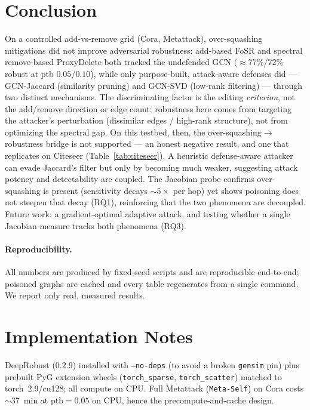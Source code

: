 \documentclass[11pt]{article}
\begin{document}
\section{Conclusion}
On a controlled add-vs-remove grid (Cora, Metattack), over-squashing mitigations did not improve
adversarial robustness: add-based FoSR and spectral remove-based ProxyDelete both tracked the undefended
GCN ($\approx$$77\%$/$72\%$ robust at ptb $0.05$/$0.10$), while only purpose-built, attack-aware defenses
did --- GCN-Jaccard (similarity pruning) and GCN-SVD (low-rank filtering) --- through two distinct
mechanisms. The discriminating factor is the editing \emph{criterion}, not the add/remove direction or
edge count: robustness here comes from targeting the attacker's perturbation (dissimilar edges / high-rank
structure), not from optimizing the spectral gap. On this testbed, then, the over-squashing$\to$robustness
bridge is not supported --- an honest negative result, and one that replicates on Citeseer
(Table~\ref{tab:citeseer}). A heuristic defense-aware attacker can evade Jaccard's filter but only by
becoming much weaker, suggesting attack potency and detectability are coupled. The Jacobian probe confirms
over-squashing is present (sensitivity decays $\sim$$5\times$ per hop) yet shows poisoning does not steepen
that decay (RQ1), reinforcing that the two phenomena are decoupled. Future work: a gradient-optimal
adaptive attack, and testing whether a single Jacobian measure tracks both phenomena (RQ3).

\paragraph{Reproducibility.} All numbers are produced by fixed-seed scripts and are reproducible end-to-end;
poisoned graphs are cached and every table regenerates from a single command. We report only real, measured
results.



\appendix
\section{Implementation Notes}
DeepRobust ($0.2.9$) installed with \texttt{--no-deps} (to avoid a broken \texttt{gensim} pin) plus prebuilt
PyG extension wheels (\texttt{torch\_sparse}, \texttt{torch\_scatter}) matched to torch~$2.9$/cu128; all
compute on CPU. Full Metattack (\texttt{Meta-Self}) on Cora costs $\sim$37~min at $\text{ptb}=0.05$ on CPU,
hence the precompute-and-cache design.
\end{document}

